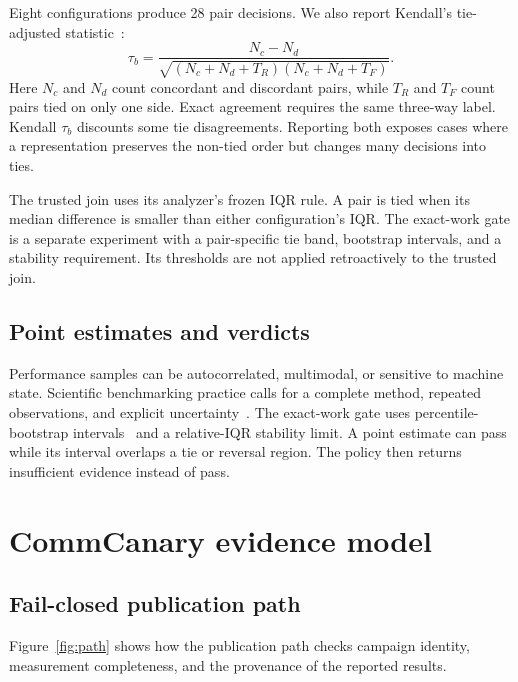 \documentclass[10pt,twocolumn]{article}
\begin{document}
Eight configurations produce 28 pair decisions. We also report Kendall's
tie-adjusted statistic~\cite{kendall}:
\begin{equation}
  \tau_b=\frac{N_c-N_d}
  {\sqrt{(N_c+N_d+T_R)(N_c+N_d+T_F)}}.
\end{equation}
Here $N_c$ and $N_d$ count concordant and discordant pairs, while $T_R$ and
$T_F$ count pairs tied on only one side. Exact agreement requires the same
three-way label. Kendall $\tau_b$ discounts some tie disagreements. Reporting
both exposes cases where a representation preserves the non-tied order but
changes many decisions into ties.

The trusted join uses its analyzer's frozen IQR rule. A pair is tied when its
median difference is smaller than either configuration's IQR. The exact-work
gate is a separate experiment with a pair-specific tie band, bootstrap
intervals, and a stability requirement. Its thresholds are not applied
retroactively to the trusted join.

\subsection{Point estimates and verdicts}

Performance samples can be autocorrelated, multimodal, or sensitive to machine
state. Scientific benchmarking practice calls for a complete method, repeated
observations, and explicit uncertainty~\cite{benchmarking}. The exact-work gate
uses percentile-bootstrap intervals~\cite{efron} and a relative-IQR stability
limit. A point estimate can pass while its interval overlaps a tie or reversal
region. The policy then returns insufficient evidence instead of pass.

\section{CommCanary evidence model}

\subsection{Fail-closed publication path}

Figure~\ref{fig:path} shows how the publication path checks campaign identity,
measurement completeness, and the provenance of the reported results.
\end{document}
